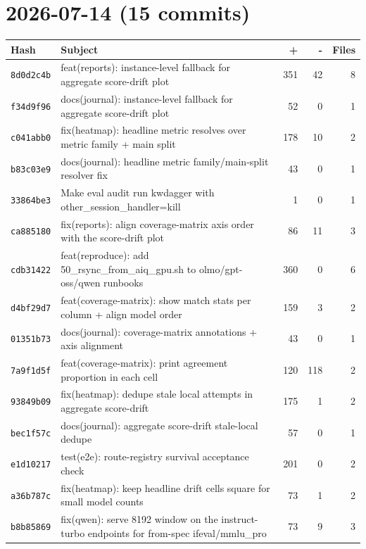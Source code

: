 \section*{2026-07-14 (15 commits)}
\begin{longtable}{@{}p{}p{}r r r@{}}
\toprule Hash & Subject & + & - & Files \\ \midrule\endhead
\texttt{8d0d2c4b} & feat(reports): instance-level fallback for aggregate score-drift plot & 351 & 42 & 8 \\
\texttt{f34d9f96} & docs(journal): instance-level fallback for aggregate score-drift plot & 52 & 0 & 1 \\
\texttt{c041abb0} & fix(heatmap): headline metric resolves over metric family + main split & 178 & 10 & 2 \\
\texttt{b83c03e9} & docs(journal): headline metric family/main-split resolver fix & 43 & 0 & 1 \\
\texttt{33864be3} & Make eval audit run kwdagger with other\_session\_handler=kill & 1 & 0 & 1 \\
\texttt{ca885180} & fix(reports): align coverage-matrix axis order with the score-drift plot & 86 & 11 & 3 \\
\texttt{cdb31422} & feat(reproduce): add 50\_rsync\_from\_aiq\_gpu.sh to olmo/gpt-oss/qwen runbooks & 360 & 0 & 6 \\
\texttt{d4bf29d7} & feat(coverage-matrix): show match stats per column + align model order & 159 & 3 & 2 \\
\texttt{01351b73} & docs(journal): coverage-matrix annotations + axis alignment & 43 & 0 & 1 \\
\texttt{7a9f1d5f} & feat(coverage-matrix): print agreement proportion in each cell & 120 & 118 & 2 \\
\texttt{93849b09} & fix(heatmap): dedupe stale local attempts in aggregate score-drift & 175 & 1 & 2 \\
\texttt{bec1f57c} & docs(journal): aggregate score-drift stale-local dedupe & 57 & 0 & 1 \\
\texttt{e1d10217} & test(e2e): route-registry survival acceptance check & 201 & 0 & 2 \\
\texttt{a36b787c} & fix(heatmap): keep headline drift cells square for small model counts & 73 & 1 & 2 \\
\texttt{b8b85869} & fix(qwen): serve 8192 window on the instruct-turbo endpoints for from-spec ifeval/mmlu\_pro & 73 & 9 & 3 \\
\bottomrule\end{longtable}
\normalsize